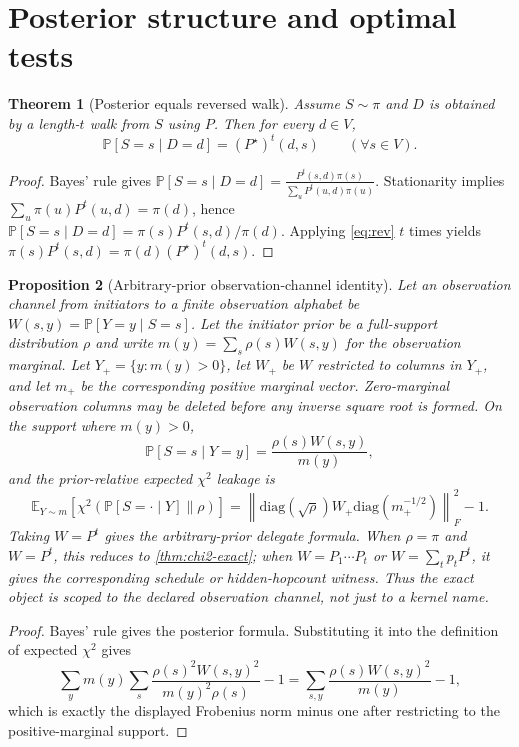 \documentclass[11pt]{article}
\newtheorem{theorem}{Theorem}[section]
\newtheorem{proposition}[theorem]{Proposition}
\newcommand{\E}{\mathbb{E}}
\newcommand{\Prb}{\mathbb{P}}
\begin{document}
\section{Posterior structure and optimal tests}\label{sec:posterior}
\begin{theorem}[Posterior equals reversed walk]\label{thm:posterior}
Assume $S\sim \pi$ and $D$ is obtained by a length-$t$ walk from $S$ using $P$.
Then for every $d\in V$,
\[
\Prb[S=s\mid D=d] = (P^\star)^t(d,s)\qquad(\forall s\in V).
\]
\end{theorem}
\begin{proof}
Bayes' rule gives
$\Prb[S=s\mid D=d]=\frac{P^t(s,d)\pi(s)}{\sum_u P^t(u,d)\pi(u)}$.
Stationarity implies $\sum_u \pi(u)P^t(u,d)=\pi(d)$, hence
$\Prb[S=s\mid D=d]=\pi(s)P^t(s,d)/\pi(d)$. Applying \eqref{eq:rev} $t$ times
yields $\pi(s)P^t(s,d)=\pi(d)(P^\star)^t(d,s)$.
\end{proof}

\begin{proposition}[Arbitrary-prior observation-channel identity]\label{prop:prior-aware}
Let an observation channel from initiators to a finite observation alphabet be
$W(s,y)=\Prb[Y=y\mid S=s]$. Let the initiator prior be a full-support distribution
$\rho$ and write $m(y)=\sum_s\rho(s)W(s,y)$ for the observation marginal.
Let $Y_+=\{y:m(y)>0\}$, let $W_+$ be $W$ restricted to columns in $Y_+$, and
let $m_+$ be the corresponding positive marginal vector.  Zero-marginal
observation columns may be deleted before any inverse square root is formed.  On
the support where $m(y)>0$,
\[
\Prb[S=s\mid Y=y]=\frac{\rho(s)W(s,y)}{m(y)},
\]
and the prior-relative expected $\chi^2$ leakage is
\[
\E_{Y\sim m}\!\left[\chi^2(\Prb[S=\cdot\mid Y]\|\rho)\right]
=\left\|\mathrm{diag}(\sqrt{\rho})W_+\mathrm{diag}(m_+^{-1/2})\right\|_F^2-1.
\]
Taking $W=P^t$ gives the arbitrary-prior delegate formula.  When $\rho=\pi$ and
$W=P^t$, this reduces to \cref{thm:chi2-exact}; when $W=P_1\cdots P_t$ or
$W=\sum_t p_tP^t$, it gives the corresponding schedule or hidden-hopcount
witness.  Thus the exact object is scoped to the declared observation channel,
not just to a kernel name.
\end{proposition}
\begin{proof}
Bayes' rule gives the posterior formula.  Substituting it into the definition of
expected $\chi^2$ gives
\[
\sum_y m(y)\sum_s \frac{\rho(s)^2W(s,y)^2}{m(y)^2\rho(s)}-1
=\sum_{s,y}\frac{\rho(s)W(s,y)^2}{m(y)}-1,
\]
which is exactly the displayed Frobenius norm minus one after restricting to the
positive-marginal support.
\end{proof}
\end{document}
